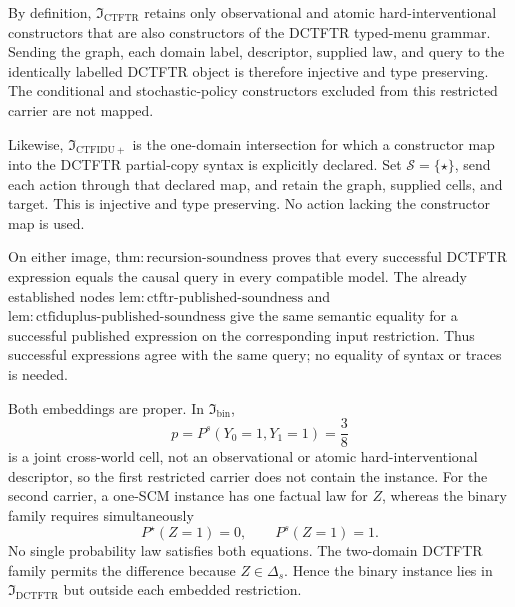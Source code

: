 By definition, \(\mathfrak I_{\mathrm{CTFTR}}\) retains only observational and atomic hard-interventional constructors that are also constructors of the DCTFTR typed-menu grammar. Sending the graph, each domain label, descriptor, supplied law, and query to the identically labelled DCTFTR object is therefore injective and type preserving. The conditional and stochastic-policy constructors excluded from this restricted carrier are not mapped.

Likewise, \(\mathfrak I_{\mathrm{CTFIDU+}}\) is the one-domain intersection for which a constructor map into the DCTFTR partial-copy syntax is explicitly declared. Set \(\mathcal S=\{\star\}\), send each action through that declared map, and retain the graph, supplied cells, and target. This is injective and type preserving. No action lacking the constructor map is used.

On either image, \(\mathrm{thm:recursion\text{-}soundness}\) proves that every successful DCTFTR expression equals the causal query in every compatible model. The already established nodes \(\mathrm{lem:ctftr\text{-}published\text{-}soundness}\) and \(\mathrm{lem:ctfiduplus\text{-}published\text{-}soundness}\) give the same semantic equality for a successful published expression on the corresponding input restriction. Thus successful expressions agree with the same query; no equality of syntax or traces is needed.

Both embeddings are proper. In \(\mathfrak I_{\mathrm{bin}}\),
\[
p=P^s(Y_0=1,Y_1=1)=\frac38
\]
is a joint cross-world cell, not an observational or atomic hard-interventional descriptor, so the first restricted carrier does not contain the instance. For the second carrier, a one-SCM instance has one factual law for \(Z\), whereas the binary family requires simultaneously
\[
P^\star(Z=1)=0,
\qquad
P^s(Z=1)=1.
\]
No single probability law satisfies both equations. The two-domain DCTFTR family permits the difference because \(Z\in\Delta_s\). Hence the binary instance lies in \(\mathfrak I_{\mathrm{DCTFTR}}\) but outside each embedded restriction.